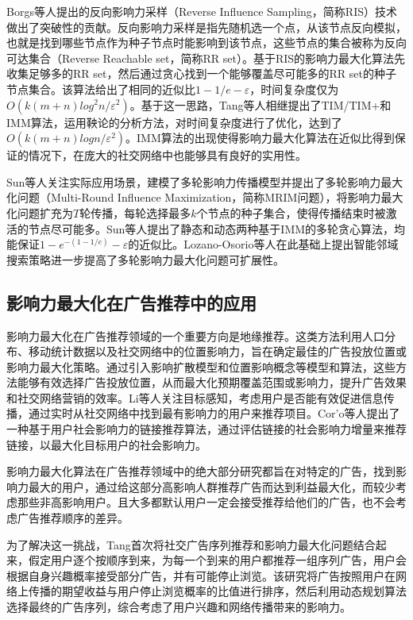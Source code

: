 Borgs等人\cite{borgs2014maximizing}提出的反向影响力采样（Reverse Influence Sampling，简称RIS）技术做出了突破性的贡献。反向影响力采样是指先随机选一个点，从该节点反向模拟，也就是找到哪些节点作为种子节点时能影响到该节点，这些节点的集合被称为反向可达集合（Reverse Reachable set，简称RR set）。基于RIS的影响力最大化算法先收集足够多的RR set，然后通过贪心找到一个能够覆盖尽可能多的RR set的种子节点集合。该算法给出了相同的近似比$1-1/e-\varepsilon$，时间复杂度仅为$O(k(m+n)log^2n/\varepsilon^2)$。基于这一思路，Tang等人相继提出了TIM/TIM+\cite{tang2014influence}和IMM\cite{tang2015influence}算法，运用鞅论的分析方法，对时间复杂度进行了优化，达到了$O(k(m+n)logn/\varepsilon^2)$。IMM算法的出现使得影响力最大化算法在近似比得到保证的情况下，在庞大的社交网络中也能够具有良好的实用性。

Sun等人关注实际应用场景，建模了多轮影响力传播模型并提出了多轮影响力最大化问题（Multi-Round Influence Maximization，简称MRIM问题）\parencite{sun2018multi}，将影响力最大化问题扩充为$T$轮传播，每轮选择最多$k$个节点的种子集合，使得传播结束时被激活的节点尽可能多。Sun等人提出了静态和动态两种基于IMM的多轮贪心算法，均能保证$1-e^{-(1-1/e)}-\varepsilon$的近似比。Lozano-Osorio等人\cite{lozano2022multi}在此基础上提出智能邻域搜索策略进一步提高了多轮影响力最大化问题可扩展性。


\subsection{影响力最大化在广告推荐中的应用}

影响力最大化在广告推荐领域的一个重要方向是地缘推荐\cite{zhang2020geodemographic,zeng2021business,saleem2019effective}。这类方法利用人口分布、移动统计数据以及社交网络中的位置影响力，旨在确定最佳的广告投放位置或影响力最大化策略。通过引入影响扩散模型和位置影响概念等模型和算法，这些方法能够有效选择广告投放位置，从而最大化预期覆盖范围或影响力，提升广告效果和社交网络营销的效率。Li等人\cite{li2015real}关注目标感知，考虑用户是否能有效促进信息传播，通过实时从社交网络中找到最有影响力的用户来推荐项目。Cor{'o}等人\cite{coro2021link}提出了一种基于用户社会影响力的链接推荐算法，通过评估链接的社会影响力增量来推荐链接，以最大化目标用户的社会影响力。

影响力最大化算法在广告推荐领域中的绝大部分研究都旨在对特定的广告，找到影响力最大的用户，通过给这部分高影响人群推荐广告而达到利益最大化，而较少考虑那些非高影响用户。且大多都默认用户一定会接受推荐给他们的广告，也不会考虑广告推荐顺序的差异。

为了解决这一挑战，Tang\cite{tang2018social}首次将社交广告序列推荐和影响力最大化问题结合起来，假定用户逐个按顺序到来，为每一个到来的用户都推荐一组序列广告，用户会根据自身兴趣概率接受部分广告，并有可能停止浏览。该研究将广告按照用户在网络上传播的期望收益与用户停止浏览概率的比值进行排序，然后利用动态规划算法选择最终的广告序列，综合考虑了用户兴趣和网络传播带来的影响力。

